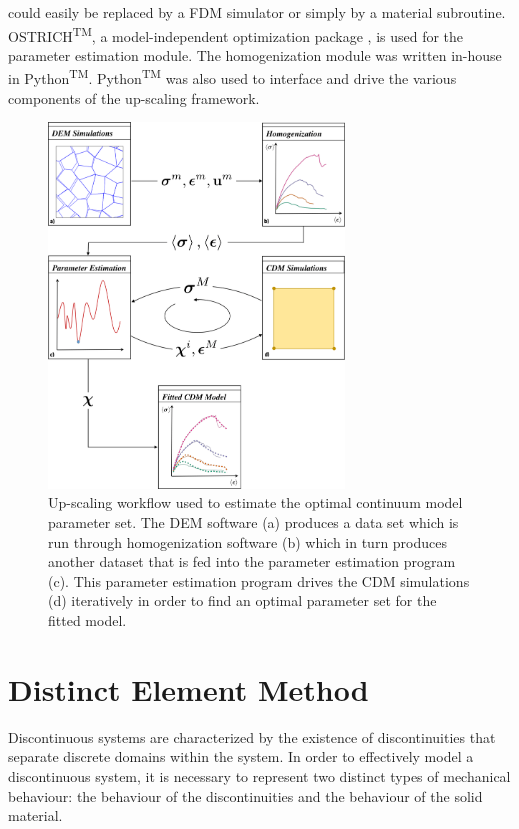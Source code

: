 could easily be replaced by a FDM simulator or simply by a material subroutine.  OSTRICH\textsuperscript{TM}, a model-independent optimization package \citep{matott_ostrich:_2016}, is used for the parameter estimation module. The homogenization module was written in-house in Python\textsuperscript{TM}. Python\textsuperscript{TM} was also used to interface and drive the various components of the up-scaling framework. 

\begin{figure}[p]
\begin{center}
\includegraphics[width=0.7\textwidth]{figures/upscalingworkflow/UpScaling Flow Chart-1}
\caption{{\label{fig:workflow}Up-scaling workflow used to estimate the optimal continuum model parameter set. The DEM software (a) produces a data set which is run through homogenization software (b) which in turn produces another dataset that is fed into the parameter estimation program (c). This parameter estimation program drives the CDM simulations (d) iteratively in order to find an optimal parameter set for the fitted model.%
}}
\end{center}
\end{figure}
\section{Distinct Element Method}
Discontinuous systems are characterized by the existence of discontinuities that separate discrete domains within the system. In order to effectively model a discontinuous system, it is necessary to represent two distinct types of mechanical behaviour: the behaviour of the discontinuities and the behaviour of the solid material.

